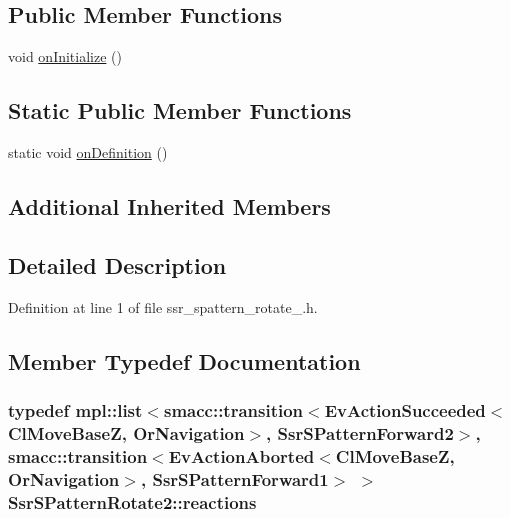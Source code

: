\subsection*{Public Member Functions}
\begin{DoxyCompactItemize}
\item 
void \hyperlink{structSsrSPatternRotate2_acae719a6c582b769e997fd4a8f79d12a}{on\+Initialize} ()
\end{DoxyCompactItemize}
\subsection*{Static Public Member Functions}
\begin{DoxyCompactItemize}
\item 
static void \hyperlink{structSsrSPatternRotate2_acfc99af790632321111d347cd4315338}{on\+Definition} ()
\end{DoxyCompactItemize}
\subsection*{Additional Inherited Members}


\subsection{Detailed Description}


Definition at line 1 of file ssr\+\_\+spattern\+\_\+rotate\+\_.\+h.



\subsection{Member Typedef Documentation}
\subsubsection[{\texorpdfstring{reactions}{reactions}}]{\setlength{\rightskip}{0pt plus 5cm}typedef mpl\+::list$<${\bf smacc\+::transition}$<$Ev\+Action\+Succeeded$<$Cl\+Move\+BaseZ, Or\+Navigation$>$, {\bf Ssr\+S\+Pattern\+Forward2}$>$, {\bf smacc\+::transition}$<$Ev\+Action\+Aborted$<$Cl\+Move\+BaseZ, Or\+Navigation$>$, {\bf Ssr\+S\+Pattern\+Forward1}$>$ $>$ {\bf Ssr\+S\+Pattern\+Rotate2\+::reactions}}\hypertarget{structSsrSPatternRotate2_a35ff2627d5a401f8b46e0ef601d34443}{}\label{structSsrSPatternRotate2_a35ff2627d5a401f8b46e0ef601d34443}


